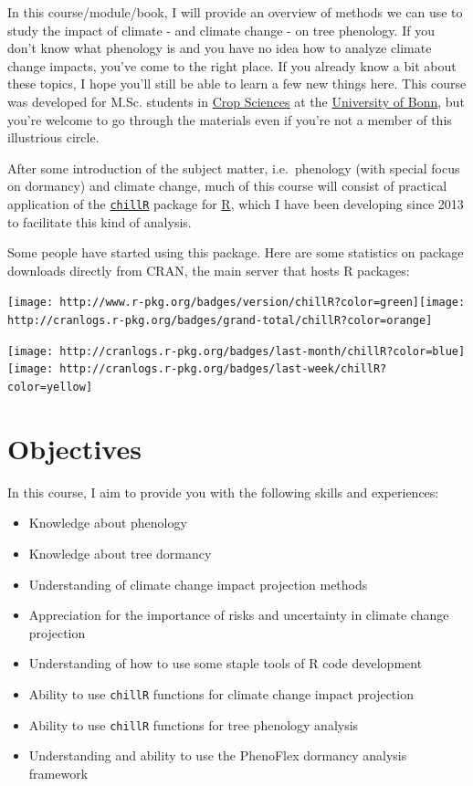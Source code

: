 \documentclass[
]{book}
\providecommand{\tightlist}{%
  \setlength{\itemsep}{0pt}\setlength{\parskip}{0pt}}
\begin{document}
In this course/module/book, I will provide an overview of methods we can use to study the impact of climate - and climate change - on tree phenology. If you don't know what phenology is and you have no idea how to analyze climate change impacts, you've come to the right place. If you already know a bit about these topics, I hope you'll still be able to learn a few new things here. This course was developed for M.Sc. students in \href{https://www.lf.uni-bonn.de/en/studying/master/npw}{Crop Sciences} at the \href{https://www.uni-bonn.de/startpage?set_language=en}{University of Bonn}, but you're welcome to go through the materials even if you're not a member of this illustrious circle.

After some introduction of the subject matter, i.e.~phenology (with special focus on dormancy) and climate change, much of this course will consist of practical application of the \href{https://cran.r-project.org/web/packages/chillR/index.html}{\texttt{chillR}} package for \href{https://www.r-project.org/}{R}, which I have been developing since 2013 to facilitate this kind of analysis.

Some people have started using this package. Here are some statistics on package downloads directly from CRAN, the main server that hosts R packages:

\texttt{[image: http://www.r-pkg.org/badges/version/chillR?color=green]}\texttt{[image: http://cranlogs.r-pkg.org/badges/grand-total/chillR?color=orange]}

\texttt{[image: http://cranlogs.r-pkg.org/badges/last-month/chillR?color=blue]}\texttt{[image: http://cranlogs.r-pkg.org/badges/last-week/chillR?color=yellow]}

\hypertarget{objectives}{%
\section{Objectives}\label{objectives}}

In this course, I aim to provide you with the following skills and experiences:

\begin{itemize}
\tightlist
\item
  Knowledge about phenology
\item
  Knowledge about tree dormancy
\item
  Understanding of climate change impact projection methods
\item
  Appreciation for the importance of risks and uncertainty in climate change projection
\item
  Understanding of how to use some staple tools of R code development
\item
  Ability to use \texttt{chillR} functions for climate change impact projection
\item
  Ability to use \texttt{chillR} functions for tree phenology analysis
\item
  Understanding and ability to use the PhenoFlex dormancy analysis framework
\end{itemize}
\end{document}
